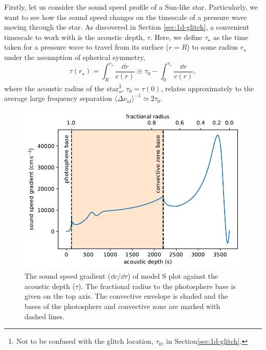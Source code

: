 Firstly, let us consider the sound speed profile of a Sun-like star. Particularly, we want to see how the sound speed changes on the timescale of a pressure wave moving through the star. As discovered in Section \ref{sec:1d-glitch}, a convenient timescale to work with is the acoustic depth, \(\tau\). Here, we define \(\tau_\star\) as the time taken for a pressure wave to travel from its surface (\(r=R\)) to some radius \(r_\star\) under the assumption of spherical symmetry,
%
\begin{equation}
    \tau(r_\star) = \int_R^{r_\star} \frac{\dd r}{c(r)} \equiv \tau_0 - \int_0^{r_\star} \frac{\dd r}{c(r)},\label{eq:tau}
\end{equation}
%
where the acoustic radius of the star\footnote{Not to be confused with the glitch location, \(\tau_0\), in Section\ref{sec:1d-glitch}.}, \(\tau_0 = \tau(0)\), relates approximately to the average large frequency separation \(\langle\Delta\nu_{nl}\rangle^{-1} \simeq 2\tau_0\).

\begin{figure}[!tb]
    \centering
    \includegraphics{figures/sound-speed-gradient.pdf}
    \caption{The sound speed gradient (\(\dd c/\dd \tau\)) of model S plot against the acoustic depth (\(\tau\)). The fractional radius to the photosphere base is given on the top axis. The convective envelope is shaded and the bases of the photosphere and convective zone are marked with dashed lines.}
    \label{fig:sound-speed-gradient}
\end{figure}

